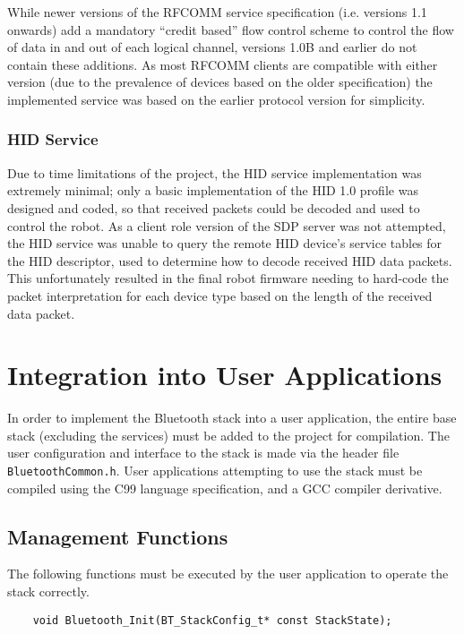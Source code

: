 While newer versions of the RFCOMM service specification (i.e. versions 1.1 onwards) add a mandatory ``credit based'' flow control scheme to control the flow of data in and out of each logical channel, versions 1.0B and earlier do not contain these additions. As most RFCOMM clients are compatible with either version (due to the prevalence of devices based on the older specification) the implemented service was based on the earlier protocol version \cite{rfcommspecs} for simplicity.

\subsubsection{HID Service}

Due to time limitations of the project, the HID service implementation was extremely minimal; only a basic implementation of the HID 1.0 profile \cite{bthidspecs} was designed and coded, so that received packets could be decoded and used to control the robot. As a client role version of the SDP server was not attempted, the HID service was unable to query the remote HID device's service tables for the HID descriptor, used to determine how to decode received HID data packets. This unfortunately resulted in the final robot firmware needing to hard-code the packet interpretation for each device type based on the length of the received data packet.

\section{Integration into User Applications}

In order to implement the Bluetooth stack into a user application, the entire base stack (excluding the services) must be added to the project for compilation. The user configuration and interface to the stack is made via the header file \texttt{BluetoothCommon.h}. User applications attempting to use the stack must be compiled using the C99 language specification, and a GCC compiler derivative.

\subsection{Management Functions}

The following functions must be executed by the user application to operate the stack correctly.

\vspace{1em}
\begin{lstlisting}
	void Bluetooth_Init(BT_StackConfig_t* const StackState);
\end{lstlisting}

